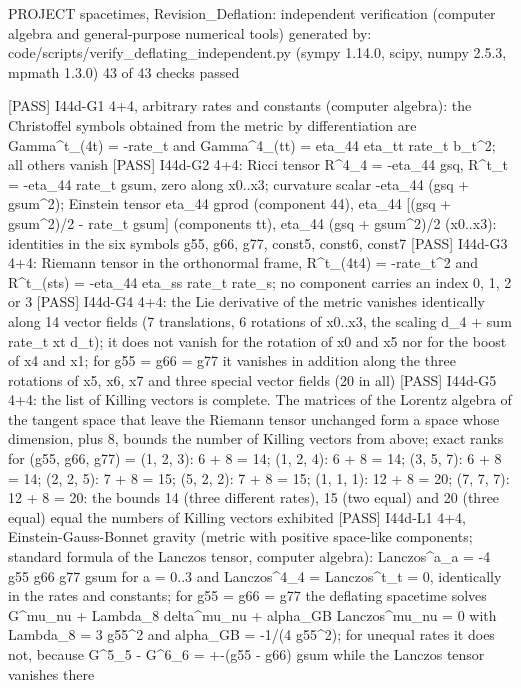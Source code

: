 \documentclass[
  10pt,
]{article}
\newenvironment{Shaded}{}{}
\newcommand{\NormalTok}[1]{#1}
\begin{document}
\begin{Shaded}
\begin{Highlighting}[]
\NormalTok{PROJECT spacetimes, Revision\_Deflation: independent verification (computer algebra and general{-}purpose numerical tools)}
\NormalTok{generated by: code/scripts/verify\_deflating\_independent.py (sympy 1.14.0, scipy, numpy 2.5.3, mpmath 1.3.0)}
\NormalTok{43 of 43 checks passed}

\NormalTok{[PASS] I44d{-}G1  4+4, arbitrary rates and constants (computer algebra): the Christoffel symbols obtained from the metric by differentiation are Gamma\^{}t\_(4t) = {-}rate\_t and Gamma\^{}4\_(tt) = eta\_44 eta\_tt rate\_t b\_t\^{}2; all others vanish}
\NormalTok{[PASS] I44d{-}G2  4+4: Ricci tensor R\^{}4\_4 = {-}eta\_44 gsq, R\^{}t\_t = {-}eta\_44 rate\_t gsum, zero along x0..x3; curvature scalar {-}eta\_44 (gsq + gsum\^{}2); Einstein tensor eta\_44 gprod (component 44), eta\_44 [(gsq + gsum\^{}2)/2 {-} rate\_t gsum] (components tt), eta\_44 (gsq + gsum\^{}2)/2 (x0..x3): identities in the six symbols g55, g66, g77, const5, const6, const7}
\NormalTok{[PASS] I44d{-}G3  4+4: Riemann tensor in the orthonormal frame, R\^{}t\_(4t4) = {-}rate\_t\^{}2 and R\^{}t\_(sts) = {-}eta\_44 eta\_ss rate\_t rate\_s; no component carries an index 0, 1, 2 or 3}
\NormalTok{[PASS] I44d{-}G4  4+4: the Lie derivative of the metric vanishes identically along 14 vector fields (7 translations, 6 rotations of x0..x3, the scaling d\_4 + sum rate\_t xt d\_t); it does not vanish for the rotation of x0 and x5 nor for the boost of x4 and x1; for g55 = g66 = g77 it vanishes in addition along the three rotations of x5, x6, x7 and three special vector fields (20 in all)}
\NormalTok{[PASS] I44d{-}G5  4+4: the list of Killing vectors is complete. The matrices of the Lorentz algebra of the tangent space that leave the Riemann tensor unchanged form a space whose dimension, plus 8, bounds the number of Killing vectors from above; exact ranks for (g55, g66, g77) = (1, 2, 3): 6 + 8 = 14; (1, 2, 4): 6 + 8 = 14; (3, 5, 7): 6 + 8 = 14; (2, 2, 5): 7 + 8 = 15; (5, 2, 2): 7 + 8 = 15; (1, 1, 1): 12 + 8 = 20; (7, 7, 7): 12 + 8 = 20: the bounds 14 (three different rates), 15 (two equal) and 20 (three equal) equal the numbers of Killing vectors exhibited}
\NormalTok{[PASS] I44d{-}L1  4+4, Einstein{-}Gauss{-}Bonnet gravity (metric with positive space{-}like components; standard formula of the Lanczos tensor, computer algebra): Lanczos\^{}a\_a = {-}4 g55 g66 g77 gsum for a = 0..3 and Lanczos\^{}4\_4 = Lanczos\^{}t\_t = 0, identically in the rates and constants; for g55 = g66 = g77 the deflating spacetime solves G\^{}mu\_nu + Lambda\_8 delta\^{}mu\_nu + alpha\_GB Lanczos\^{}mu\_nu = 0 with Lambda\_8 = 3 g55\^{}2 and alpha\_GB = {-}1/(4 g55\^{}2); for unequal rates it does not, because G\^{}5\_5 {-} G\^{}6\_6 = +{-}(g55 {-} g66) gsum while the Lanczos tensor vanishes there}

\end{Highlighting}
\end{Shaded}
\end{document}
